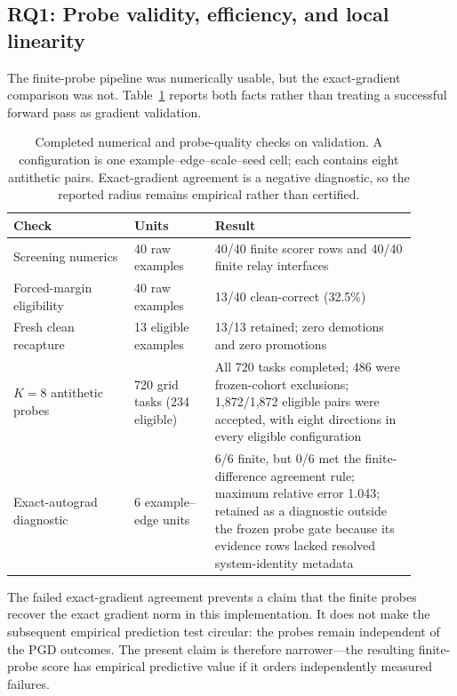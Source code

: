 \documentclass[11pt]{article}
\begin{document}
\subsection{RQ1: Probe validity, efficiency, and local linearity}

The finite-probe pipeline was numerically usable, but the exact-gradient
comparison was not. Table~\ref{tab:probe-validation} reports both facts rather
than treating a successful forward pass as gradient validation.

\begin{table}[t]
\centering
\small
\setlength{\tabcolsep}{4.0pt}
\caption{Completed numerical and probe-quality checks on validation. A
configuration is one example--edge--scale--seed cell; each contains eight
antithetic pairs. Exact-gradient agreement is a negative diagnostic, so the
reported radius remains empirical rather than certified.}
\label{tab:probe-validation}
\begin{tabular}{p{0.27\linewidth}p{0.18\linewidth}p{0.45\linewidth}}
\toprule
Check & Units & Result \\
\midrule
Screening numerics & 40 raw examples & 40/40 finite scorer rows and
40/40 finite relay interfaces \\
Forced-margin eligibility & 40 raw examples & 13/40 clean-correct (32.5\%) \\
Fresh clean recapture & 13 eligible examples & 13/13 retained; zero demotions
and zero promotions \\
$K=8$ antithetic probes & 720 grid tasks (234 eligible) & All 720 tasks
completed; 486 were frozen-cohort exclusions; 1,872/1,872 eligible pairs were
accepted, with eight directions in every eligible configuration \\
Exact-autograd diagnostic & 6 example--edge units & 6/6 finite, but 0/6 met
the finite-difference agreement rule; maximum relative error 1.043; retained
as a diagnostic outside the frozen probe gate because its evidence rows lacked
resolved system-identity metadata \\
\bottomrule
\end{tabular}
\end{table}

The failed exact-gradient agreement prevents a claim that the finite probes
recover the exact gradient norm in this implementation. It does not make the
subsequent empirical prediction test circular: the probes remain independent
of the PGD outcomes. The present claim is therefore narrower---the resulting
finite-probe score has empirical predictive value if it orders independently
measured failures.
\end{document}
